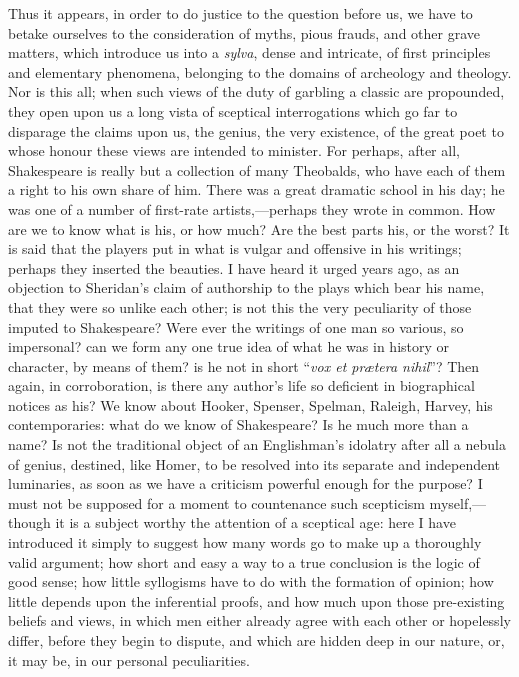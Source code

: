 Thus it appears, in order to do justice to the question before us,
we have to betake ourselves to the consideration of myths, pious
frauds, and other grave matters, which introduce us into a \emph{sylva},
dense and intricate, of first principles and elementary phenomena,
belonging to the domains of archeology and theology. Nor is this all;
when such views of the duty of garbling a classic are propounded, they
open upon us a long vista of sceptical interrogations which go far to
disparage the claims upon us, the genius, the very existence, of the
great poet to whose honour these views are intended to minister. For
perhaps, after all, Shakespeare is really but a collection of many
Theobalds, who have each of them a right to his own share of him.
There was a great dramatic school in his day; he was one of a number
of first-rate artists,—perhaps they wrote in common. How are we to
know what is his, or how much? Are the best parts his, or the worst?
It is said that the players put in what is vulgar and offensive in his
writings; perhaps they inserted the beauties. I have heard it urged
years ago, as an objection to Sheridan's claim of authorship to the
plays which bear his name, that they were so unlike each other; is not
this the very peculiarity of those imputed to Shakespeare? Were ever
the writings of one man so various, so impersonal? can we form any one
true idea of what he was in history or character, by means of them? is
he not in short ``\emph{vox et prætera nihil}''? Then again,
in corroboration, is there any author's life so deficient in
biographical notices as his? We know about Hooker, Spenser, Spelman,
Raleigh, Harvey, his contemporaries: what do we know of Shakespeare?
Is he much more than a name? Is not the traditional object of an
Englishman's idolatry after all a nebula of genius, destined, like
Homer, to be resolved into its separate and independent luminaries, as
soon as we have a criticism powerful enough for the purpose? I must
not be supposed for a moment to countenance such scepticism myself,—though
it is a subject worthy the attention of a sceptical age: here I have
introduced it simply to suggest how many words go to make up a
thoroughly valid argument; how short and easy a way to a true
conclusion is the logic of good sense; how little syllogisms have to
do with the formation of opinion; how little depends upon the
inferential proofs, and how much upon those pre-existing beliefs and
views, in which men either already agree with each other or hopelessly
differ, before they begin to dispute, and which are hidden deep in our
nature, or, it may be, in our personal peculiarities.

